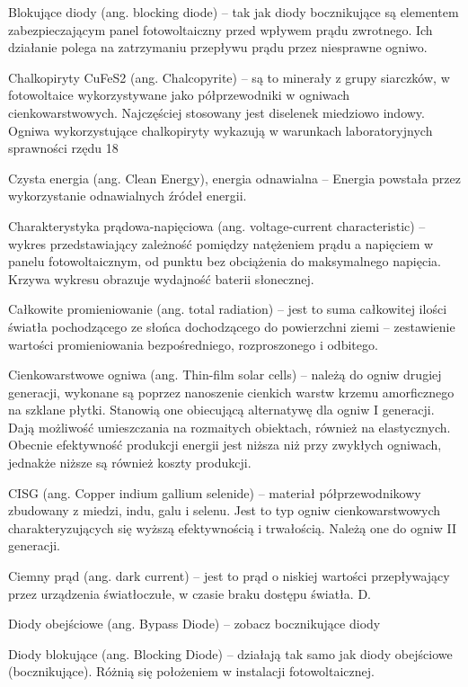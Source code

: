 \documentclass[12pt,a4paper]{article}
\begin{document}
Blokujące diody (ang. blocking diode) – tak jak diody bocznikujące są elementem zabezpieczającym panel fotowoltaiczny przed wpływem prądu zwrotnego. Ich działanie polega na zatrzymaniu przepływu prądu przez niesprawne ogniwo.


Chalkopiryty CuFeS2 (ang. Chalcopyrite) – są to minerały z grupy siarczków, w fotowoltaice wykorzystywane jako półprzewodniki w ogniwach cienkowarstwowych. Najczęściej stosowany jest diselenek miedziowo indowy. Ogniwa wykorzystujące chalkopiryty wykazują w warunkach laboratoryjnych sprawności rzędu 18%

Czysta energia (ang. Clean Energy), energia odnawialna – Energia powstała przez wykorzystanie odnawialnych źródeł energii.

Charakterystyka prądowa-napięciowa (ang. voltage-current characteristic) – wykres przedstawiający zależność pomiędzy natężeniem prądu a napięciem w panelu fotowoltaicznym, od punktu bez obciążenia do maksymalnego napięcia. Krzywa wykresu obrazuje wydajność baterii słonecznej.

Całkowite promieniowanie (ang. total radiation) – jest to suma całkowitej ilości światła pochodzącego ze słońca dochodzącego do powierzchni ziemi – zestawienie wartości promieniowania bezpośredniego, rozproszonego i odbitego.

Cienkowarstwowe ogniwa (ang. Thin-film solar cells) – należą do ogniw drugiej generacji, wykonane są poprzez nanoszenie cienkich warstw krzemu amorficznego na szklane płytki. Stanowią one obiecującą alternatywę dla ogniw I generacji. Dają możliwość umieszczania na rozmaitych obiektach, również na elastycznych. Obecnie efektywność produkcji energii jest niższa niż przy zwykłych ogniwach, jednakże niższe są również koszty produkcji.

CISG (ang. Copper indium gallium selenide) – materiał półprzewodnikowy zbudowany z miedzi, indu, galu i selenu. Jest to typ ogniw cienkowarstwowych charakteryzujących się wyższą efektywnością i trwałością. Należą one do ogniw II generacji.

Ciemny prąd (ang. dark current) – jest to prąd o niskiej wartości przepływający przez urządzenia światłoczułe, w czasie braku dostępu światła.
D.

Diody obejściowe (ang. Bypass Diode) – zobacz bocznikujące diody

Diody blokujące (ang. Blocking Diode) – działają tak samo jak diody obejściowe (bocznikujące). Różnią się położeniem w instalacji fotowoltaicznej.
\end{document}
